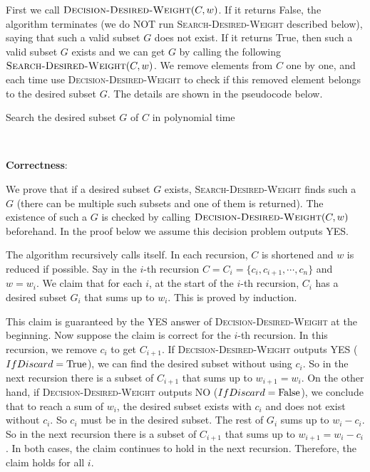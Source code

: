 \documentclass{article}
\begin{document}
First we call $\textsc{Decision-Desired-Weight}(C,w)$. If it returns False, the algorithm terminates (we do NOT run \textsc{Search-Desired-Weight} described below), saying that such a valid subset $G$ does not exist. If it returns True, then such a valid subset $G$ exists and we can get $G$ by calling the following $\textsc{Search-Desired-Weight}(C,w)$. We remove elements from $C$ one by one, and each time use \textsc{Decision-Desired-Weight} to check if this removed element belongs to the desired subset $G$. The details are shown in the pseudocode below.
\begin{algorithm}
\caption{Search the desired subset $G$ of $C$ in polynomial time}
\begin{algorithmic}[1]
\State{}
	\Else{}
	\EndIf
\EndIf
\State{}
\EndProcedure
\end{algorithmic}
\end{algorithm}

~

\noindent\textbf{Correctness}:

We prove that if a desired subset $G$ exists, \textsc{Search-Desired-Weight} finds such a $G$ (there can be multiple such subsets and one of them is returned). The existence of such a $G$ is checked by calling $\textsc{Decision-Desired-Weight}(C,w)$ beforehand. In the proof below we assume this decision problem outputs YES.

The algorithm recursively calls itself. In each recursion, $C$ is shortened and $w$ is reduced if possible. Say in the $i$-th recursion $C=C_i=\{c_i,c_{i+1},\cdots,c_n\}$ and $w=w_i$. We claim that for each $i$, at the start of the $i$-th recursion, $C_i$ has a desired subset $G_i$ that sums up to $w_i$. This is proved by induction.

This claim is guaranteed by the YES answer of \textsc{Decision-Desired-Weight} at the beginning. Now suppose the claim is correct for the $i$-th recursion. In this recursion, we remove $c_i$ to get $C_{i+1}$. If \textsc{Decision-Desired-Weight} outputs YES ($IfDiscard=\textup{True}$), we can find the desired subset without using $c_i$. So in the next recursion there is a subset of $C_{i+1}$ that sums up to $w_{i+1}=w_i$. On the other hand, if \textsc{Decision-Desired-Weight} outputs NO ($IfDiscard=\textup{False}$), we conclude that to reach a sum of $w_i$, the desired subset exists with $c_i$ and does not exist without $c_i$. So $c_i$ must be in the desired subset. The rest of $G_i$ sums up to $w_i-c_i$. So in the next recursion there is a subset of $C_{i+1}$ that sums up to $w_{i+1}=w_i-c_i$. In both cases, the claim continues to hold in the next recursion. Therefore, the claim holds for all $i$.
\end{document}
